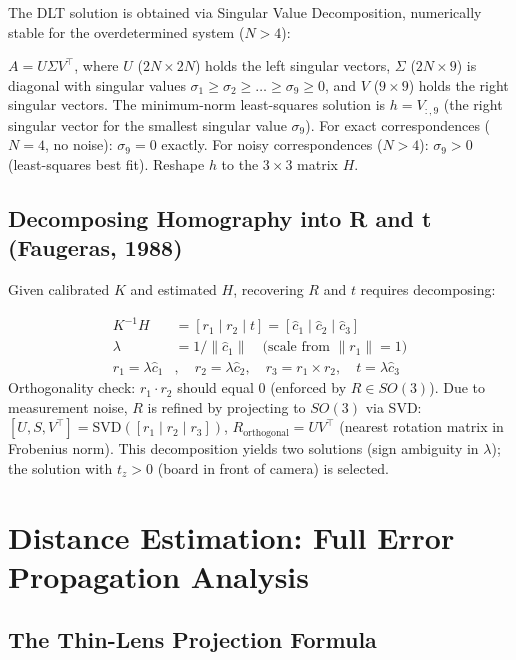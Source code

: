 The DLT solution is obtained via Singular Value Decomposition, numerically stable for the overdetermined system ($N>4$):

\begin{eqblock}
$A = U\Sigma V^\top$, where $U$ ($2N\times2N$) holds the left singular vectors, $\Sigma$ ($2N\times9$) is diagonal with singular values $\sigma_1\geq\sigma_2\geq\dots\geq\sigma_9\geq0$, and $V$ ($9\times9$) holds the right singular vectors. The minimum-norm least-squares solution is $h = V_{:,9}$ (the right singular vector for the smallest singular value $\sigma_9$). For exact correspondences ($N=4$, no noise): $\sigma_9=0$ exactly. For noisy correspondences ($N>4$): $\sigma_9>0$ (least-squares best fit). Reshape $h$ to the $3\times3$ matrix $H$.
\end{eqblock}

\subsection{Decomposing Homography into R and t (Faugeras, 1988)}

Given calibrated $K$ and estimated $H$, recovering $R$ and $t$ requires decomposing:

\begin{eqblock}
\begin{align}
K^{-1}H &= [r_1\mid r_2\mid t] = [\hat c_1\mid \hat c_2\mid \hat c_3] \\
\lambda &= 1/\|\hat c_1\| \quad \text{(scale from } \|r_1\|=1\text{)} \\
r_1 = \lambda\hat c_1&, \quad r_2 = \lambda\hat c_2, \quad r_3 = r_1\times r_2, \quad t=\lambda\hat c_3
\end{align}
Orthogonality check: $r_1\cdot r_2$ should equal 0 (enforced by $R\in SO(3)$). Due to measurement noise, $R$ is refined by projecting to $SO(3)$ via SVD: $[U,S,V^\top]=\text{SVD}([r_1\mid r_2\mid r_3])$, $R_{\text{orthogonal}} = UV^\top$ (nearest rotation matrix in Frobenius norm). This decomposition yields two solutions (sign ambiguity in $\lambda$); the solution with $t_z>0$ (board in front of camera) is selected.
\end{eqblock}

\section{Distance Estimation: Full Error Propagation Analysis}

\subsection{The Thin-Lens Projection Formula}

